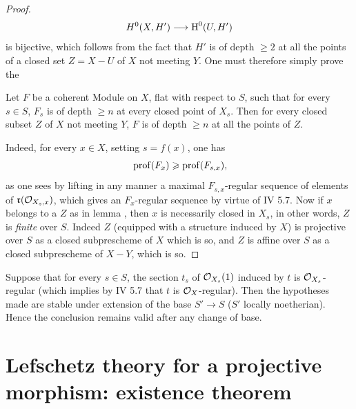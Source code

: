 \begin{proof}
\[
H^0(X, H')\to\H^0(U, H')
\]
is bijective, which follows from the fact that $H'$ is of depth $\geq 2$ at all the points of a closed set $Z=X- U$ of $X$ not meeting $Y$. One must therefore simply prove the

\begin{lemma} \label{XII.2.5} Let $F$ be a coherent Module on $X$, flat with respect to $S$, such that for every $s\in S$, $F_s$ is of depth $\geq n$ at every closed point of $X_s$. Then for every closed subset $Z$ of $X$ not meeting $Y$, $F$ is of depth $\geq n$ at all the points of $Z$.
\end{lemma}

Indeed, for every $x\in X$, setting $s=f(x)$, one has
\steco
\begin{equation} \label{eq:XII.16} {}\operatorname{prof}(F_x)\geqslant \operatorname{prof}(F_{s, x}),
\end{equation}
as one sees by lifting in any manner a maximal $F_{s, x}$-regular sequence of elements of $\mathfrak{r}({\mathcal O}_{X_s, x})$, which gives an $F_x$-regular sequence by virtue of  IV 5.7. Now if $x$ belongs to a $Z$ as in lemma , then $x$ is necessarily closed in $X_s$, in other words, $Z$ is \emph{finite} over $S$. Indeed $Z$ (equipped with a structure induced by $X$) is projective over $S$ as a closed subprescheme of $X$ which is so, and $Z$ is affine over $S$ as a closed subprescheme of $X- Y$, which is so.
\skipqed
\end{proof}

\begin{remark} \label{XII.2.6}
Suppose that for every $s\in S$, the section $t_s$ of ${\mathcal O}_{X_s}(1)$ induced by $t$ is ${\mathcal O}_{X_s}$-regular (which implies by  IV 5.7 that $t$ is $\mathcal{O}_X$-regular). Then the hypotheses made are stable under extension of the base $S'\to S$ ($S'$ locally noetherian). Hence the conclusion remains valid after any change of base.
\end{remark}

\section[Lefschetz theory for a projective morphism: existence]{Lefschetz theory for a projective morphism: existence theorem}\label{XII.3}%

